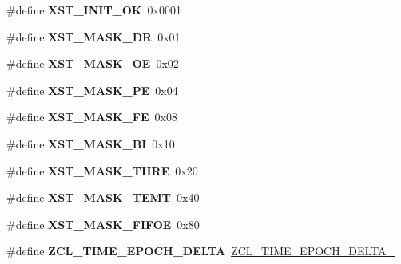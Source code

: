 \begin{DoxyCompactItemize}
\item 
\hypertarget{group__hal__dos_gac0bb5dfc7862723940463fc4f534a2c6}{\#define {\bfseries X\-S\-T\-\_\-\-I\-N\-I\-T\-\_\-\-O\-K}~0x0001}\label{group__hal__dos_gac0bb5dfc7862723940463fc4f534a2c6}

\item 
\hypertarget{group__hal__dos_ga4a10627ecbaf4dd77aae7f9edb4a54f4}{\#define {\bfseries X\-S\-T\-\_\-\-M\-A\-S\-K\-\_\-\-D\-R}~0x01}\label{group__hal__dos_ga4a10627ecbaf4dd77aae7f9edb4a54f4}

\item 
\hypertarget{group__hal__dos_gaacce3cb69756eab817972ff8facdda96}{\#define {\bfseries X\-S\-T\-\_\-\-M\-A\-S\-K\-\_\-\-O\-E}~0x02}\label{group__hal__dos_gaacce3cb69756eab817972ff8facdda96}

\item 
\hypertarget{group__hal__dos_gab800504524b4de7eea0d273db77f6156}{\#define {\bfseries X\-S\-T\-\_\-\-M\-A\-S\-K\-\_\-\-P\-E}~0x04}\label{group__hal__dos_gab800504524b4de7eea0d273db77f6156}

\item 
\hypertarget{group__hal__dos_gaff4d8f56c8de5ecfdba8ded318c2717e}{\#define {\bfseries X\-S\-T\-\_\-\-M\-A\-S\-K\-\_\-\-F\-E}~0x08}\label{group__hal__dos_gaff4d8f56c8de5ecfdba8ded318c2717e}

\item 
\hypertarget{group__hal__dos_ga0ca1fda9d4b7f78e3e5a6d4cc3f6ae85}{\#define {\bfseries X\-S\-T\-\_\-\-M\-A\-S\-K\-\_\-\-B\-I}~0x10}\label{group__hal__dos_ga0ca1fda9d4b7f78e3e5a6d4cc3f6ae85}

\item 
\hypertarget{group__hal__dos_ga50f54b3db3391cfe1d6eced271e265e9}{\#define {\bfseries X\-S\-T\-\_\-\-M\-A\-S\-K\-\_\-\-T\-H\-R\-E}~0x20}\label{group__hal__dos_ga50f54b3db3391cfe1d6eced271e265e9}

\item 
\hypertarget{group__hal__dos_ga82f8805477291e063bd3f555f9916cba}{\#define {\bfseries X\-S\-T\-\_\-\-M\-A\-S\-K\-\_\-\-T\-E\-M\-T}~0x40}\label{group__hal__dos_ga82f8805477291e063bd3f555f9916cba}

\item 
\hypertarget{group__hal__dos_ga646ea2f68b9f1418a33cd38384576cc9}{\#define {\bfseries X\-S\-T\-\_\-\-M\-A\-S\-K\-\_\-\-F\-I\-F\-O\-E}~0x80}\label{group__hal__dos_ga646ea2f68b9f1418a33cd38384576cc9}

\item 
\hypertarget{group__hal__dos_ga503caf44f78cc52dc196c413cd6c78ab}{\#define {\bfseries Z\-C\-L\-\_\-\-T\-I\-M\-E\-\_\-\-E\-P\-O\-C\-H\-\_\-\-D\-E\-L\-T\-A}~\hyperlink{group__hal_ga735b0974380a73e9d7a12a1f199a5921}{Z\-C\-L\-\_\-\-T\-I\-M\-E\-\_\-\-E\-P\-O\-C\-H\-\_\-\-D\-E\-L\-T\-A\-\_}}\label{group__hal__dos_ga503caf44f78cc52dc196c413cd6c78ab}


\end{DoxyCompactItemize}
